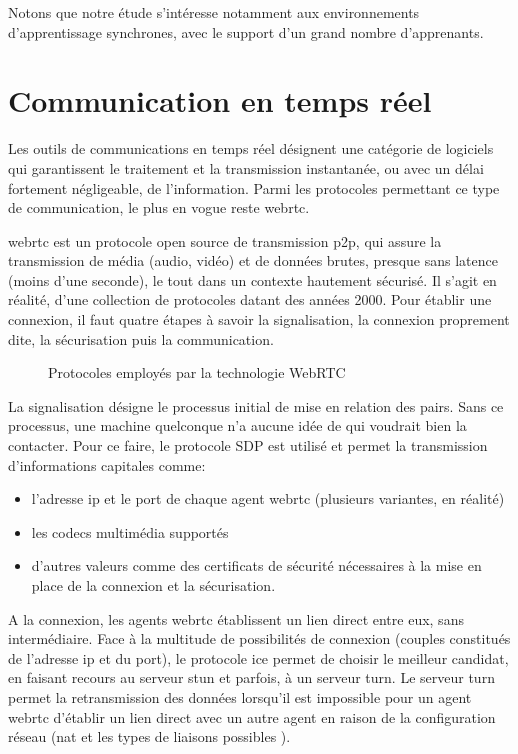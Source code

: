 Notons que notre étude s'intéresse notamment aux environnements d’apprentissage synchrones, 
avec le support d’un grand nombre d’apprenants.

\section{Communication en temps réel}
Les outils de communications en temps réel désignent une catégorie de logiciels qui garantissent le traitement et la transmission instantanée, 
ou avec un délai fortement négligeable,  de l’information. 
Parmi les protocoles permettant ce type de communication, le plus en vogue reste \acrfull{webrtc}.


\acrshort{webrtc} est un protocole open source de transmission \acrfull{p2p}, qui assure la transmission de média (audio, vidéo) 
et de données brutes, presque sans latence (moins d’une seconde), 
le tout dans un contexte hautement sécurisé. 
Il s’agit en réalité, d’une collection de protocoles datant des années 2000. 
Pour établir une connexion, il faut quatre étapes à savoir la signalisation, la connexion proprement dite, la sécurisation puis la communication.

\newpage
\begin{figure}[h]
  \centering
  \caption{Protocoles employés par la technologie WebRTC}
  \label{fig:webrtc_protocols}
\end{figure}

La signalisation désigne le processus initial de mise en relation des pairs. 
Sans ce processus, une machine quelconque n’a aucune idée de qui voudrait bien la contacter. 
Pour ce faire, le protocole SDP est utilisé et permet la transmission d’informations capitales comme:

\begin{itemize}
  \item l’adresse \acrshort{ip} et le port de chaque agent \acrshort{webrtc} (plusieurs variantes, en réalité)
  \item les codecs multimédia supportés
  \item d’autres valeurs comme des certificats de sécurité nécessaires à la mise en place de la connexion et la sécurisation.
\end{itemize}


A la connexion, les agents \acrshort{webrtc} établissent un lien direct entre eux, sans intermédiaire. 
Face à la multitude de possibilités de connexion (couples constitués de l’adresse \acrshort{ip} et du port), 
le protocole \acrshort{ice} permet de choisir le meilleur candidat, en faisant recours au serveur \acrshort{stun} et parfois, à un serveur \acrshort{turn}. 
Le serveur \acrshort{turn} permet la retransmission des données lorsqu’il est impossible pour un agent \acrshort{webrtc} d'établir un lien 
direct avec un autre agent en raison de la configuration réseau (\acrshort{nat} et les types de liaisons possibles \cite{nat_links}).

